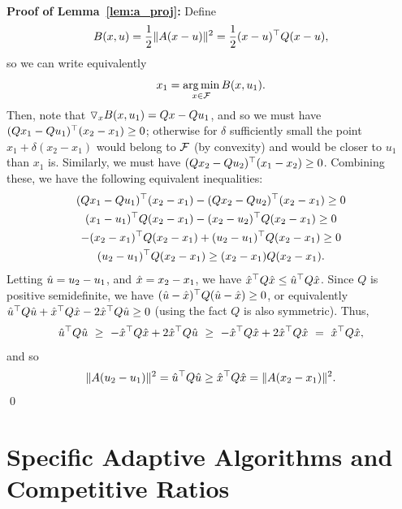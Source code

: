 \ \\
\noindent
\textbf{Proof of Lemma~\ref{lem:a_proj}:}
Define
\[B(x, u) = \frac{1}{2}\| A(x-u) \|^2 = \frac{1}{2}(x-u)^\top Q(x-u),\]
 so we can write equivalently
\[x_1 = \mathop{\rm arg\,min}_{x \in \mathcal{F}} B(x, u_1).\]
Then, note that $\triangledown_x B(x, u_1) = Qx - Qu_1$, and so we must have
$(Qx_1 - Qu_1)^\top (x_2 - x_1) \geq 0$; otherwise for $\delta$
sufficiently small the point $x_1  + \delta (x_2 - x_1)$
would belong to $\mathcal{F}$ (by convexity) and would be closer to $u_1$ than
$x_1$ is.
Similarly, we must have $(Qx_2 - Qu_2)^\top (x_1 - x_2) \geq 0$.
Combining these, we have the following equivalent inequalities:
\begin{gather*}
(Qx_1 - Qu_1)^\top (x_2 - x_1) - (Qx_2 - Qu_2)^\top (x_2 - x_1)\geq 0\\
(x_1 - u_1)^\top Q(x_2 - x_1) - (x_2 - u_2)^\top Q(x_2 - x_1)\geq 0\\
-(x_2 - x_1)^\top Q(x_2 - x_1) + (u_2 - u_1)^\top Q(x_2 - x_1)\geq 0\\
(u_2 - u_1)^\top Q(x_2 - x_1) \geq (x_2 - x_1)Q(x_2 - x_1).
\end{gather*}
Letting $\hat{u} = u_2 - u_1$, and $\hat{x} = x_2 - x_1$, we have $\hat{x}^\top Q\hat{x}
\leq \hat{u}^\top Q\hat{x}$.  Since $Q$ is positive semidefinite, we
have $(\hat{u} - \hat{x})^\top Q(\hat{u} - \hat{x}) \geq 0$, or equivalently $\hat{u}^\top Q\hat{u} +
\hat{x}^\top Q\hat{x} - 2 \hat{x}^\top Q\hat{u} \geq 0$ (using the fact $Q$ is also symmetric).  Thus,
\begin{align*}
\hat{u}^\top Q\hat{u}  
    \ \geq \ - \hat{x}^\top Q\hat{x} + 2 \hat{x}^\top Q\hat{u} 
    \ \geq \ - \hat{x}^\top Q\hat{x} + 2 \hat{x}^\top Q\hat{x} 
    \  =  \ \hat{x}^\top Q\hat{x},
\end{align*}
and so
\[\| A(u_2 - u_1) \|^2 = \hat{u}^\top Q\hat{u} \geq  \hat{x}^\top Q\hat{x} = \| A(x_2 - x_1) \|^2.\]
\qed


\section{Specific Adaptive Algorithms and Competitive Ratios}
\label{sec:ratios}

